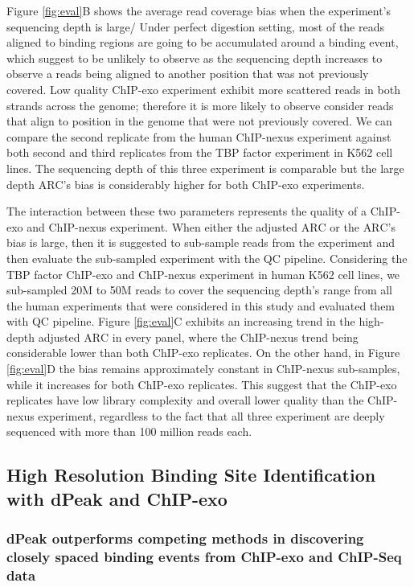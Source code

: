 \documentclass{bmcart}\usepackage[]{graphicx}\usepackage[]{color}
\begin{document}
Figure \ref{fig:eval}B shows the average read coverage bias when the
experiment's sequencing depth is large/ Under perfect digestion
setting, most of the reads aligned to binding regions are going to be
accumulated around a binding event, which suggest to be unlikely to
observe as the sequencing depth increases to observe a reads being
aligned to another position that was not previously covered. Low
quality ChIP-exo experiment exhibit more scattered reads in both
strands across the genome; therefore it is more likely to observe
consider reads that align to position in the genome that were not
previously covered. We can compare the second replicate from the human
ChIP-nexus experiment against both second and third replicates from
the TBP factor experiment in K562 cell lines. The sequencing depth of
this three experiment is comparable but the large depth $\mbox{ARC}$'s
bias is considerably higher for both ChIP-exo experiments.

The interaction between these two parameters represents the quality of
a ChIP-exo and ChIP-nexus experiment. When either the adjusted
$\mbox{ARC}$ or the $\mbox{ARC}$'s bias is large, then it is suggested
to sub-sample reads from the experiment and then evaluate the
sub-sampled experiment with the QC pipeline. Considering the TBP
factor ChIP-exo \cite{venters13} and ChIP-nexus \cite{chipnexus}
experiment in human K562 cell lines, we sub-sampled 20M to 50M reads
to cover the sequencing depth's range from all the human experiments
that were considered in this study and evaluated them with QC
pipeline. Figure \ref{fig:eval}C exhibits an increasing trend in the
high-depth adjusted $\mbox{ARC}$ in every panel, where the ChIP-nexus
trend being considerable lower than both ChIP-exo replicates. On the
other hand, in Figure \ref{fig:eval}D the bias remains approximately
constant in ChIP-nexus sub-samples, while it increases for both
ChIP-exo replicates. This suggest that the ChIP-exo replicates have
low library complexity and overall lower quality than the ChIP-nexus
experiment, regardless to the fact that all three experiment are
deeply sequenced with more than 100 million reads each.

\subsection*{High Resolution Binding Site Identification with dPeak and
  ChIP-exo}

\subsubsection*{dPeak outperforms competing methods in discovering closely
  spaced binding events from ChIP-exo and ChIP-Seq data}
\end{document}
